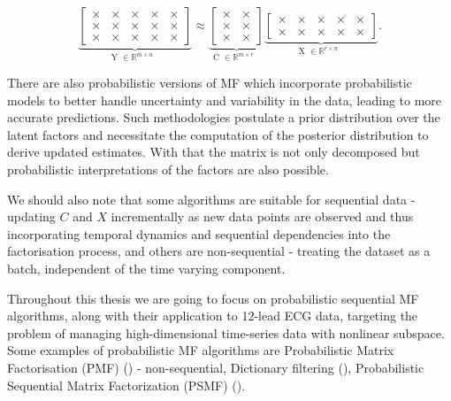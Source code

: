 \documentclass{mldsmsc}
\begin{document}
\begin{equation}
\underbrace{
\begin{bmatrix}
  \times & \times & \times & \times & \times \\
  \times & \times & \times & \times & \times \\
  \times & \times & \times & \times & \times
\end{bmatrix}
}_{\text{Y $\in \mathbb{R}^{m \times n}$ }}
\approx
\underbrace{
\begin{bmatrix}
  \times & \times \\
  \times & \times \\
  \times & \times
\end{bmatrix}
}_{\text{C $\in \mathbb{R}^{m \times r}$ }}
\underbrace{
\begin{bmatrix}
  \times & \times & \times & \times & \times \\
  \times & \times & \times & \times & \times
\end{bmatrix}
}_{\text{X $\in \mathbb{R}^{r \times n}$ }}.
\end{equation}

\noindent There are also probabilistic versions of MF which incorporate probabilistic models to better handle uncertainty and variability in the data, leading to more accurate predictions. Such methodologies postulate a prior distribution over the latent factors and necessitate the computation of the posterior distribution to derive updated estimates. With that the matrix is not only decomposed but probabilistic interpretations of the factors are also possible. \newline

\noindent We should also note that some algorithms are suitable for sequential data - updating $C$ and $X$ incrementally as new data points are observed and thus incorporating temporal dynamics and sequential dependencies into the factorisation process, and others are non-sequential - treating the dataset as a batch, independent of the time varying component. \newline

\noindent Throughout this thesis we are going to focus on probabilistic sequential MF algorithms, along with their application to 12-lead ECG data, targeting the problem of managing high-dimensional time-series data with nonlinear subspace. Some examples of probabilistic MF algorithms are Probabilistic Matrix Factorisation (PMF) (\cite{NIPS2007_d7322ed7}) - non-sequential, Dictionary filtering (\cite{cite-key}), Probabilistic Sequential Matrix Factorization (PSMF) (\cite{akyildiz2021probabilistic}). \newline
\end{document}
